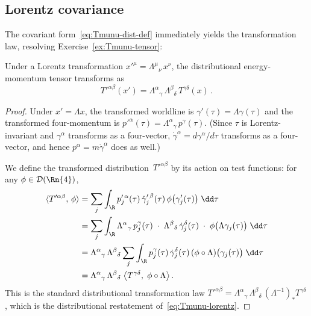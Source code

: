 \subsection{Lorentz covariance}\label{sec:lorentz-covariance-add}

The covariant form~\eqref{eq:Tmunu-dist-def} immediately yields
the transformation law, resolving
Exercise~\ref{ex:Tmunu-tensor}:

\begin{proposition}\label{prop:lorentz-cov}
  Under a Lorentz transformation
  $x'^\mu = \Lambda^\mu{}_\nu\, x^\nu$, the distributional
  energy-momentum tensor transforms as
  \begin{equation}\label{eq:Tmunu-lorentz}
    T'^{\alpha\beta}(x')
      = \Lambda^\alpha{}_\gamma\,
        \Lambda^\beta{}_\delta\,
        T^{\gamma\delta}(x)\,.
  \end{equation}
\end{proposition}

\begin{proof}
  Under $x' = \Lambda x$, the transformed worldline is
  $\gamma'(\tau) = \Lambda\gamma(\tau)$ and the transformed
  four-momentum is $p'^\alpha(\tau) = \Lambda^\alpha{}_\gamma\,
  p^\gamma(\tau)$.  (Since $\tau$ is Lorentz-invariant and
  $\gamma^\alpha$ transforms as a four-vector,
  $\dot\gamma^\alpha = d\gamma^\alpha/d\tau$ transforms as a
  four-vector, and hence
  $p^\alpha = m\dot\gamma^\alpha$ does as well.)

  We define the transformed distribution~$T'^{\alpha\beta}$ by
  its action on test functions: for any
  $\phi \in \mathcal{D}(\Rn{4})$,
  \begin{align}
    \langle T'^{\alpha\beta},\,\phi\rangle
      &= \sum_j \int_{\R} p_j'^{\,\alpha}(\tau)\,
        \dot\gamma_j'^{\,\beta}(\tau)\,
        \phi\bigl(\gamma_j'(\tau)\bigr)\;\dd\tau
      \notag\\
      &= \sum_j \int_{\R}
        \Lambda^\alpha{}_\gamma\, p_j^\gamma(\tau)\;\cdot\;
        \Lambda^\beta{}_\delta\, \dot\gamma_j^\delta(\tau)\;\cdot\;
        \phi\bigl(\Lambda\gamma_j(\tau)\bigr)\;\dd\tau
      \notag\\
      &= \Lambda^\alpha{}_\gamma\,\Lambda^\beta{}_\delta
        \sum_j \int_{\R} p_j^\gamma(\tau)\,
        \dot\gamma_j^\delta(\tau)\,
        (\phi \circ \Lambda)\bigl(\gamma_j(\tau)\bigr)\;\dd\tau
      \notag\\
      &= \Lambda^\alpha{}_\gamma\,\Lambda^\beta{}_\delta\;
        \bigl\langle T^{\gamma\delta},\;
        \phi \circ \Lambda\bigr\rangle\,.
      \label{eq:Tmunu-lorentz-dist}
  \end{align}
  This is the standard distributional transformation law
  $T'^{\alpha\beta} = \Lambda^\alpha{}_\gamma\,
  \Lambda^\beta{}_\delta\,(\Lambda^{-1})_\ast T^{\gamma\delta}$,
  which is the distributional restatement
  of~\eqref{eq:Tmunu-lorentz}.
\end{proof}


